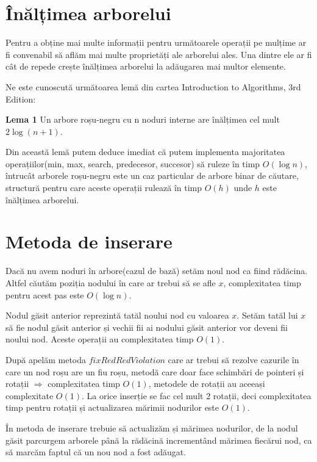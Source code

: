 \documentclass[]{report}
\begin{document}
	\section*{Înălțimea arborelui}

	Pentru a obține mai multe informații pentru următoarele operații pe mulțime
	ar fi convenabil să aflăm mai multe proprietăți ale arborelui ales. Una dintre
	ele ar fi cât de repede crește înălțimea arborelui la adăugarea mai multor elemente.

	Ne este cunoscută următoarea lemă din cartea Introduction to Algorithms, 3rd Edition:

	\textbf{Lema 1} Un arbore roșu-negru cu n noduri interne are înălțimea cel mult
	$2\log(n+1)$. \cite{alg}

	Din această lemă putem deduce imediat că putem implementa majoritatea 
	operațiilor(min, max, search, predecesor, succesor) să ruleze în timp $O(\log n)$,
	întrucât arborele roșu-negru este un caz particular de arbore binar de căutare,
	structură pentru care aceste operații rulează în timp $O(h)$ unde $h$ este
	înălțimea arborelui.
	
	\section*{Metoda de inserare}

	Dacă nu avem noduri în arbore(cazul de bază) setăm noul nod ca fiind rădăcina.
	Altfel căutăm poziția nodului în care ar trebui să se afle $x$,
	complexitatea timp pentru acest pas este $O(\log n)$.

	Nodul găsit anterior reprezintă tatăl noului nod cu valoarea $x$. Setăm tatăl
	lui $x$ să fie nodul găsit anterior și vechii fii ai nodului găsit anterior
	vor deveni fii noului nod. Aceste operații au complexitatea timp $O(1)$.
	
	După apelăm metoda $fixRedRedViolation$ care ar trebui să rezolve cazurile
	în care un nod roșu are un fiu roșu, metodă care doar face schimbări de
	pointeri și rotații $\Rightarrow$ complexitatea timp $O(1)$, metodele de
	rotații au aceeași complexitate $O(1)$. La orice inserție se fac cel mult
	2 rotații, deci complexitatea timp pentru rotații și actualizarea mărimii
	nodurilor este $O(1)$.

	În metoda de inserare trebuie să actualizăm și mărimea nodurilor, de la 
	nodul găsit parcurgem arborele până la rădăcină	incrementând mărimea 
	fiecărui nod, ca să marcăm faptul că un nou nod a fost adăugat.
\end{document}

